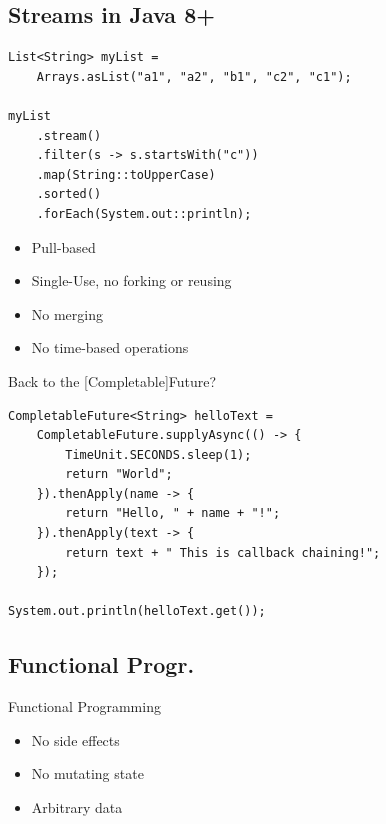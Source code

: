 \subsection{Streams in Java 8+}\label{sec:java}
\begin{frame}[fragile]{{}}
  \begin{verbatim}
List<String> myList =
    Arrays.asList("a1", "a2", "b1", "c2", "c1");

myList
    .stream()
    .filter(s -> s.startsWith("c"))
    .map(String::toUpperCase)
    .sorted()
    .forEach(System.out::println);
  \end{verbatim}
\end{frame}

\begin{frame}{{}}
	\begin{itemize}
		\item Pull-based
        \item Single-Use, no forking or reusing
        \item No merging
        \item No time-based operations
	\end{itemize}
\end{frame}

\begin{frame}[fragile]{Back to the [Completable]Future?}
  \begin{verbatim}
CompletableFuture<String> helloText =
    CompletableFuture.supplyAsync(() -> {
        TimeUnit.SECONDS.sleep(1);
        return "World";
    }).thenApply(name -> {
        return "Hello, " + name + "!";
    }).thenApply(text -> {
        return text + " This is callback chaining!";
    });

System.out.println(helloText.get());
  \end{verbatim}
\end{frame}

\subsection{Functional Progr.}
\begin{frame}{Functional Programming}
	\begin{itemize}
        \item No side effects
        \item No mutating state
        \item Arbitrary data
	\end{itemize}
\end{frame}

